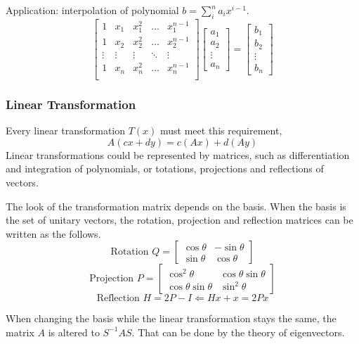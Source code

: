 Application: interpolation of polynomial $b=\sum_i^n a_i x^{i-1}$.
\begin{equation}
	\begin{bmatrix}
		1 & x_1 & x_1^2 & \ldots & x_1^{n-1}\\
		1 & x_2 & x_2^2 & \ldots & x_2^{n-1}\\
		\vdots & \vdots & \vdots & \ddots & \vdots\\
		1 & x_n & x_n^2 & \ldots & x_n^{n-1}\\
	\end{bmatrix}
	\begin{bmatrix}
		a_1 \\ a_2 \\ \vdots \\ a_n 
	\end{bmatrix}
	=
	\begin{bmatrix}
		b_1 \\ b_2 \\ \vdots \\ b_n
	\end{bmatrix}
\end{equation}

 \subsubsection{Linear Transformation}

 Every linear transformation $T(x)$ must meet this requirement,
 $$ A(cx+dy) = c(Ax) + d(Ay) $$
 Linear transformations could be represented by matrices, such as
 differentiation and integration of polynomials, or totations, projections
 and reflections of vectors.

 The look of the transformation matrix depends on the basis. When the basis
 is the set of unitary vectors, the rotation, projection and reflection
 matrices can be written as the follows.
 $$\text{Rotation } Q = \begin{bmatrix} \cos\theta & -\sin\theta \\
	 \sin\theta & \cos\theta \end{bmatrix}$$
 $$\text{Projection } P = \begin{bmatrix} \cos^2\theta & \cos\theta\sin\theta \\
	 \cos\theta\sin\theta & \sin^2\theta \end{bmatrix}$$
 $$\text{Reflection } H = 2P - I \Leftarrow Hx + x = 2Px$$

 When changing the basis while the linear transformation stays the same,
 the matrix $A$ is altered to $S^{-1}AS$. That can be done by the theory
 of eigenvectors.

